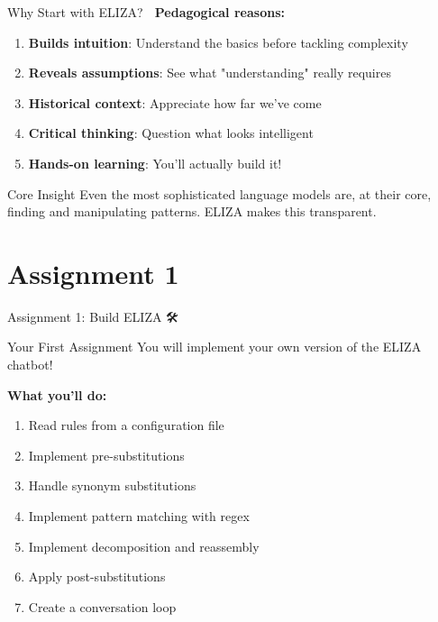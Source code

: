 \documentclass[aspectratio=169]{beamer}
\begin{document}
\begin{frame}{Why Start with ELIZA? 🎯}
\small
\textbf{Pedagogical reasons:}

\begin{enumerate}\setlength{\itemsep}{0pt}
    \item \textbf{Builds intuition}: Understand the basics before tackling complexity
    \item \textbf{Reveals assumptions}: See what "understanding" really requires
    \item \textbf{Historical context}: Appreciate how far we've come
    \item \textbf{Critical thinking}: Question what looks intelligent
    \item \textbf{Hands-on learning}: You'll actually build it!
\end{enumerate}

\vspace{0.3cm}

\begin{block}{Core Insight}
Even the most sophisticated language models are, at their core, finding and manipulating patterns. ELIZA makes this transparent.
\end{block}
\end{frame}

\section{Assignment 1}

\begin{frame}[shrink=10]{Assignment 1: Build ELIZA 🛠️}
\begin{alertblock}{Your First Assignment}
You will implement your own version of the ELIZA chatbot!
\end{alertblock}

\vspace{0.3cm}

\textbf{What you'll do:}
\begin{enumerate}\setlength{\itemsep}{0pt}
    \item Read rules from a configuration file
    \item Implement pre-substitutions
    \item Handle synonym substitutions
    \item Implement pattern matching with regex
    \item Implement decomposition and reassembly
    \item Apply post-substitutions
    \item Create a conversation loop
\end{enumerate}
\end{frame}
\end{document}
